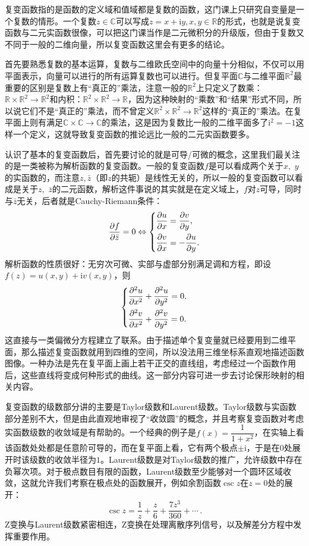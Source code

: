 复变函数指的是函数的定义域和值域都是复数的函数，这门课上只研究自变量是一个复数的情形。一个复数$z\in\mathbb{C}$可以写成$z=x+\mathrm{i}y, x,y\in\mathbb{R}$的形式，也就是说复变函数与二元实函数很像，可以把这门课当作是二元微积分的升级版，但由于复数又不同于一般的二维向量，所以复变函数这里会有更多的结论。

首先要熟悉复数的基本运算，复数与二维欧氏空间中的向量十分相似，不仅可以用平面表示，向量可以进行的所有运算复数也可以进行。但复平面$\mathbb{C}$与二维平面$\mathbb{R}^2$最重要的区别是复数上有“真正的”乘法，注意一般的$\mathbb{R}^2$上只定义了数乘：$\mathbb{R} \times \mathbb{R}^2 \to \mathbb{R}^2$和内积：$\mathbb{R}^2 \times \mathbb{R}^2 \to \mathbb{R}$，因为这种映射的“乘数”和“结果”形式不同，所以说它们不是“真正的”乘法，而不曾定义$\mathbb{R}^2 \times \mathbb{R}^2 \to \mathbb{R}^2$这样的“真正的”乘法。在复平面上则有满足$\mathbb{C} \times \mathbb{C} \to \mathbb{C}$的乘法，这是因为复数比一般的二维平面多了$\mathrm{i}^2=-1$这样一个定义，这就导致复变函数的推论远比一般的二元实函数要多。

认识了基本的复变函数后，首先要讨论的就是可导/可微的概念，这里我们最关注的是一类被称为解析函数的复变函数。一般的复变函数$f$是可以看成两个关于$x$,~$y$的实函数的，而注意$z,\bar{z}$（即$z$的共轭）是线性无关的，所以一般的复变函数可以看成是关于$z$,~$\bar{z}$的二元函数，解析这件事说的其实就是在定义域上，$f$对$z$可导，同时与$\bar{z}$无关，后者就是Cauchy-Riemann条件：
\[
	\frac{\partial f}{\partial \bar{z}}=0 \Leftrightarrow
	\begin{dcases}
		\dfrac{\partial u}{\partial x}=\dfrac{\partial v}{\partial y},  \\
		\dfrac{\partial v}{\partial x}=-\dfrac{\partial u}{\partial y}. \\
	\end{dcases}
\]
解析函数的性质很好：无穷次可微、实部与虚部分别满足调和方程，即设$f(z)=u(x,y)+\mathrm{i}v(x,y)$，则
\[
	\begin{dcases}
		\dfrac{\partial ^2u}{\partial x^2}+\dfrac{\partial ^2u}{\partial y^2}=0, \\
		\dfrac{\partial ^2v}{\partial x^2}+\dfrac{\partial ^2v}{\partial y^2}=0. \\
	\end{dcases}
\]
这直接与一类偏微分方程建立了联系。由于描述单个复变量就已经要用到二维平面，那么描述复变函数就用到四维的空间，所以没法用三维坐标系直观地描述函数图像。一种办法是先在复平面上画上若干正交的直线组，考虑经过一个函数作用后，这些直线将变成何种形式的曲线。这一部分内容可进一步去讨论保形映射的相关内容。

复变函数的级数部分讲的主要是Taylor级数和Laurent级数。Taylor级数与实函数部分差别不大，但是由此直观地审视了“收敛圆”的概念，并且考察复变函数对考虑实函数级数的收敛域是有帮助的。一个经典的例子是$f(x)=\dfrac{1}{1+x^2}$，在实轴上看该函数处处都是任意阶可导的，而在复平面上看，它有两个极点$\pm\mathrm{i}$，于是在$0$处展开时该级数的收敛半径为$1$。Laurent级数是对Taylor级数的推广，允许级数中存在负幂次项。对于极点数目有限的函数，Laurent级数至少能够对一个圆环区域收敛，这就允许我们考察在极点处的函数展开，例如余割函数$\csc z$在$z=0$处的展开：
\[
	\csc z=\frac{1}{z}+\frac{z}{6}+\frac{7z^3}{360}+\cdots\,.
\]
Z变换与Laurent级数紧密相连，Z变换在处理离散序列信号，以及解差分方程中发挥重要作用。

